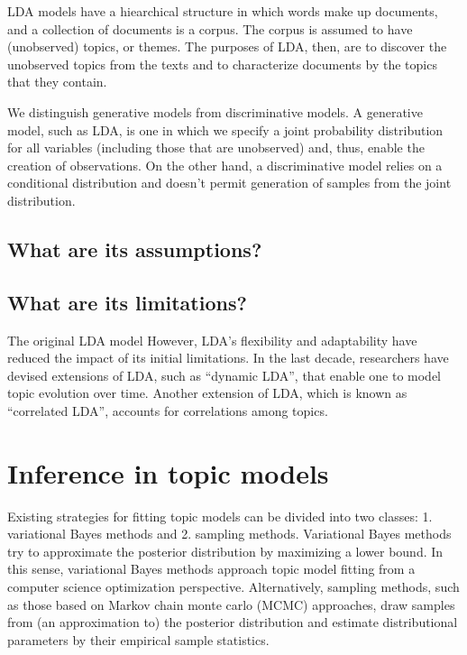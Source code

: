 \documentclass[12pt,]{article}
\begin{document}
LDA models have a hiearchical structure in which words make up
documents, and a collection of documents is a corpus. The corpus is
assumed to have (unobserved) topics, or themes. The purposes of LDA,
then, are to discover the unobserved topics from the texts and to
characterize documents by the topics that they contain.

We distinguish generative models from discriminative models. A
generative model, such as LDA, is one in which we specify a joint
probability distribution for all variables (including those that are
unobserved) and, thus, enable the creation of observations. On the other
hand, a discriminative model relies on a conditional distribution and
doesn't permit generation of samples from the joint distribution.

\subsection{What are its assumptions?}\label{what-are-its-assumptions}

\subsection{What are its limitations?}\label{what-are-its-limitations}

The original LDA model However, LDA's flexibility and adaptability have
reduced the impact of its initial limitations. In the last decade,
researchers have devised extensions of LDA, such as ``dynamic LDA'',
that enable one to model topic evolution over time. Another extension of
LDA, which is known as ``correlated LDA'', accounts for correlations
among topics.

\section{Inference in topic models}\label{inference-in-topic-models}

Existing strategies for fitting topic models can be divided into two
classes: 1. variational Bayes methods and 2. sampling methods.
Variational Bayes methods try to approximate the posterior distribution
by maximizing a lower bound. In this sense, variational Bayes methods
approach topic model fitting from a computer science optimization
perspective. Alternatively, sampling methods, such as those based on
Markov chain monte carlo (MCMC) approaches, draw samples from (an
approximation to) the posterior distribution and estimate distributional
parameters by their empirical sample statistics.
\end{document}

